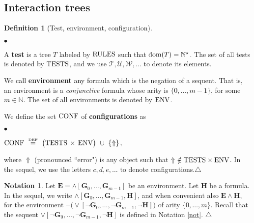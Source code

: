 \documentclass[copyright,creativecommons]{eptcs}
\newcommand{\NN}{\mathbb{N}}
\newcommand{\eqdef}{\stackrel{\text{\tiny \textnormal{DEF}}}{=}}
\newcommand{\cT}{\mathcal{T}}
\newcommand{\cU}{\mathcal{U}}
\newcommand{\ccW}{\mathcal{W}}
\newcommand{\bG}{\mathbf{G}}
\newcommand{\bH}{\mathbf{H}}
\newcommand{\bE}{\mathbf{E}}
\newcommand{\dom}{\ensuremath{\textnormal{dom}}}
\newcommand{\conf}{\textnormal{CONF}}
\newcommand{\rules}{\textnormal{RULES}}
\newcommand{\TES}{\textnormal{TESTS}}
\newcommand{\envir}{\textnormal{ENV}}
\theoremstyle{definition}
\newtheorem{Definition}[theorem]{Definition}
\newtheorem{Notation}[theorem]{Notation}
\newcommand{\squishlist}{
 \begin{list}{$\bullet$}
  { \setlength{\itemsep}{0pt}
     \setlength{\parsep}{3pt}
     \setlength{\topsep}{3pt}
     \setlength{\partopsep}{0pt}
     \setlength{\leftmargin}{1em}
     \setlength{\labelwidth}{1.5em}
     \setlength{\labelsep}{0.5em} } }
\newcommand{\squishend}{
  \end{list}  }
\newcommand{\sqi}{
 \begin{list}{$\bullet$}
  { \setlength{\itemsep}{0pt}
     \setlength{\parsep}{3pt}
     \setlength{\topsep}{3pt}
     \setlength{\partopsep}{0pt}
     \setlength{\leftmargin}{1.4em}
     \setlength{\labelwidth}{1.5em}
     \setlength{\labelsep}{0.3em} } }
\newcommand{\sqe}{
  \end{list}  }
\begin{document}
\subsection{Interaction trees} \label{sec trees}


\begin{Definition}[Test, environment, configuration]
\label{envir} \hfill
\sqi
\item[(1)] A  \textbf{test} is a tree  $T$ labeled by $\rules$ such that $\dom(T) = \NN^\star$. The set of all tests is denoted by $\TES$, and
we use  $\cT, \cU, \ccW,\ldots$ to denote its elements.
\item[(2)] We call \textbf{environment}   any formula
which is the negation of a sequent. That is, an environment
is a  \emph{conjunctive} formula
whose arity is $\{0,\ldots,m-1\}$, for some
$m \in \NN$.
The set of  all environments is denoted by $\envir$.
\item[(3)] We define the set $\conf$ of  \textbf{configurations} as
\squishlist
\item[]{ \centering
$\conf \ \eqdef \  \big(  \TES \!  \ \times \! \ \envir \big) \ \cup \ \{ \Uparrow\}$,
\par}
\squishend
\noindent where $\Uparrow$ (pronounced ``error")    is any object such that  $\Uparrow \ \notin \TES \times \envir$.
In the sequel, we use the letters $c, d, e , \ldots $ to denote configurations.\hfill$\triangle$
\sqe

\end{Definition}





\begin{Notation}
Let $\bE  = \wedge[\bG_0,\ldots, \bG_{m-1}]$
 be an environment.
Let    $\bH$ be a formula. In the sequel, we write
$\wedge[\bG_0,\ldots, \bG_{m-1}, \bH]$,   and when convenient also   $\bE \wedge \bH$,
 for the environment
$ \neg \big(\vee[\neg \bG_0,\ldots, \neg \bG_{m-1}, \neg\bH]\big)$  of arity $\{0, \ldots , m\}$. Recall that the sequent $\vee[\neg \bG_0,\ldots, \neg \bG_{m-1}, \neg\bH]$ is defined in
Notation \ref{not}.
 \hfill $\triangle$

\end{Notation}
\end{document}
